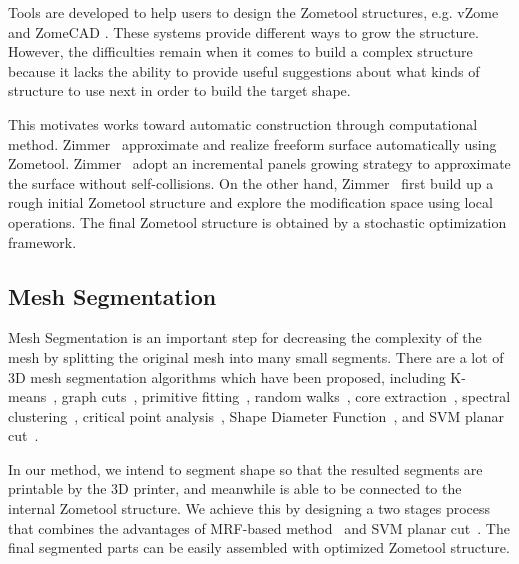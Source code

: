 Tools are developed to help users to design the Zometool structures, e.g. vZome \cite{SVZ} and ZomeCAD \cite{ESZ}.
These systems provide different ways to grow the structure.
However, the difficulties remain when it comes to build a complex structure because it lacks the ability to provide useful suggestions about what kinds of structure to use next in order to build the target shape.

This motivates works toward automatic construction through computational method.
Zimmer~\cite{zimmer:2014:Zometool,zimmer:2014:tvcg} approximate and realize freeform surface automatically using Zometool.
Zimmer~\cite{zimmer:2014:tvcg} adopt an incremental panels growing strategy to approximate the surface without self-collisions.
On the other hand, Zimmer~\cite{zimmer:2014:Zometool} first build up a rough initial Zometool structure and explore the modification space using local operations. The final Zometool structure is obtained by a stochastic optimization framework.

\subsection{Mesh Segmentation}
Mesh Segmentation is an important step for decreasing the complexity of the mesh by splitting the original mesh into many small segments. 
There are a lot of 3D mesh segmentation algorithms which have been proposed, including K-means~\cite{shlafman:2002:metamorphosis}, graph cuts~\cite{boykov:2004:experimental, golovinskiy:2008:randomized}, primitive fitting~\cite{attene2006hierarchical}, random walks~\cite{lai2008fast}, core extraction~\cite{katz2005mesh}, spectral clustering~\cite{liu2004segmentation}, critical point analysis~\cite{lin2007visual}, Shape Diameter Function~\cite{shapira:2008:consistent}, and SVM planar cut~\cite{wang2016improved}.

In our method, we intend to segment shape so that the resulted segments are printable by the 3D printer, and meanwhile is able to be connected to the internal Zometool structure.
We achieve this by designing a two stages process that combines the advantages of MRF-based method~\cite{boykov:2004:experimental} and SVM planar cut~\cite{wang2016improved}.
The final segmented parts can be easily assembled with optimized Zometool structure.




